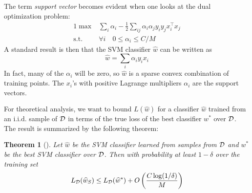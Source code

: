 \documentclass[english]{article}
\theoremstyle{plain}
\newtheorem{theorem}{Theorem}
\begin{document}
The term \emph{support vector} becomes evident when one looks at the dual optimization problem:
\begin{alignat}{1}
\max & \sum_{i}\alpha_{i}-\frac{1}{2}\sum_{ij}\alpha_{i}\alpha_{j}y_{i}y_{j}x_{i}^{\top}x_{j}\\
\text{s.t.} & \forall i\quad0\leq\alpha_{i}\leq C/M
\label{eq:dual_svm}
\end{alignat}
A standard result is then that the SVM classifier $\widehat{w}$ can be written as
\begin{equation}
\widehat{w} = \sum_i \alpha_i y_i x_i
\label{eq:w_dual}
\end{equation}
In fact, many of the $\alpha_i$ will be zero, so $\widehat{w}$ is a sparse convex combination of training points.
The $x_i$'s with positive Lagrange multipliers $\alpha_i$ are the support vectors.

For theoretical analysis, we want to bound $L(\widehat{w})$ for a classifier $\widehat{w}$ trained from an i.i.d. sample of $\cal D$ in terms of the true loss of the best classifier $w^*$ over $\cal D$.
The result is summarized by the following theorem:
\begin{theorem}[\citet{Sridharan08}]
\label{thm:svm-generalization}
Let $\widehat{w}$ be the SVM classifier learned from samples from $\cal D$ and $w^*$ be the best SVM classifier over $\cal D$. Then with probability at least $1 - \delta$ over the training set
\[
L_{\cal D}(\widehat{w}_S) \leq L_{\cal D}(\widehat{w}^*) + O\left(\frac{C \log (1/\delta)}{M}\right)
\]
\end{theorem}
\end{document}
